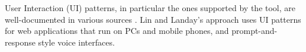 \documentclass[10pt, conference, compsocconf]{IEEEtran}
\begin{document}

User Interaction (UI) patterns, in particular the ones supported by the tool, are well-documented in various sources \cite{tidwell2010designing, van2001patterns, neil12standard,sinnig2005patterns}. Lin and Landay's approach \cite{lin2008employing} uses UI patterns for web applications that run on PCs and mobile phones, and prompt-and-response style voice interfaces. %
\end{document}
